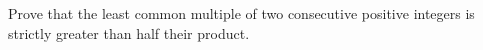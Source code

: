 Prove that the least common multiple of two consecutive positive integers is strictly greater than half their product.

